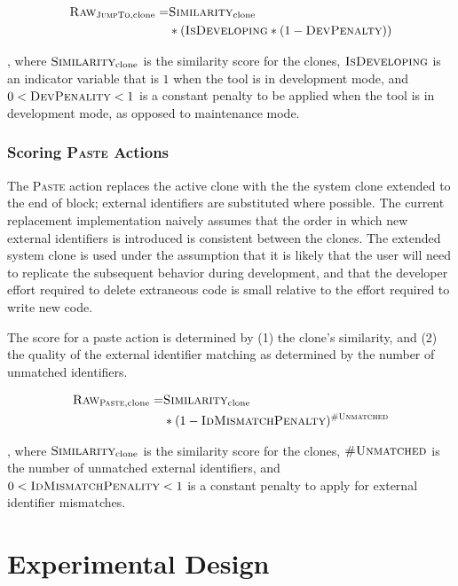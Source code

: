 \documentclass[nocopyrightspace,10pt]{sigplanconf}
\begin{document}
\begin{align*}
  \textsc{Raw}_{\textsc{JumpTo}, \text{clone}} = & \textsc{Similarity}_{\text{clone}} \\ 
   & * (\textsc{IsDeveloping} * (1 - \textsc{DevPenalty}))
\end{align*}

\noindent, where $\textsc{Similarity}_{\text{clone}}$ is the
similarity score for the clones, $\textsc{IsDeveloping}$ is an
indicator variable that is $1$ when the tool is in development mode,
and $0 < \textsc{DevPenality} < 1$ is a constant penalty to be applied
when the tool is in development mode, as opposed to maintenance mode.

\subsubsection{Scoring \textsc{Paste} Actions}
The \textsc{Paste} action replaces the active clone with the the
system clone extended to the end of block; external identifiers are
substituted where possible. The current replacement implementation
naively assumes that the order in which new external identifiers is
introduced is consistent between the clones.  The extended system
clone is used under the assumption that it is likely that the user
will need to replicate the subsequent behavior during development, and
that the developer effort required to delete extraneous code is small
relative to the effort required to write new code.

The score for a paste action is determined by (1) the clone's
similarity, and (2) the quality of the external identifier matching as
determined by the number of unmatched identifiers.

\begin{align*}
  \textsc{Raw}_{\textsc{Paste}, \text{clone}} = & \textsc{Similarity}_{\text{clone}} \\ 
   & * (1 - \textsc{IdMismatchPenalty})^{\textsc{\#Unmatched}}
\end{align*}

\noindent, where $\textsc{Similarity}_{\text{clone}}$ is the
similarity score for the clones, $\textsc{\#Unmatched}$ is the number
of unmatched external identifiers, and $0 <
\textsc{IdMismatchPenality} < 1$ is a constant penalty to apply for
external identifier mismatches.

\section{Experimental Design}
\label{sec:eval}
\end{document}
